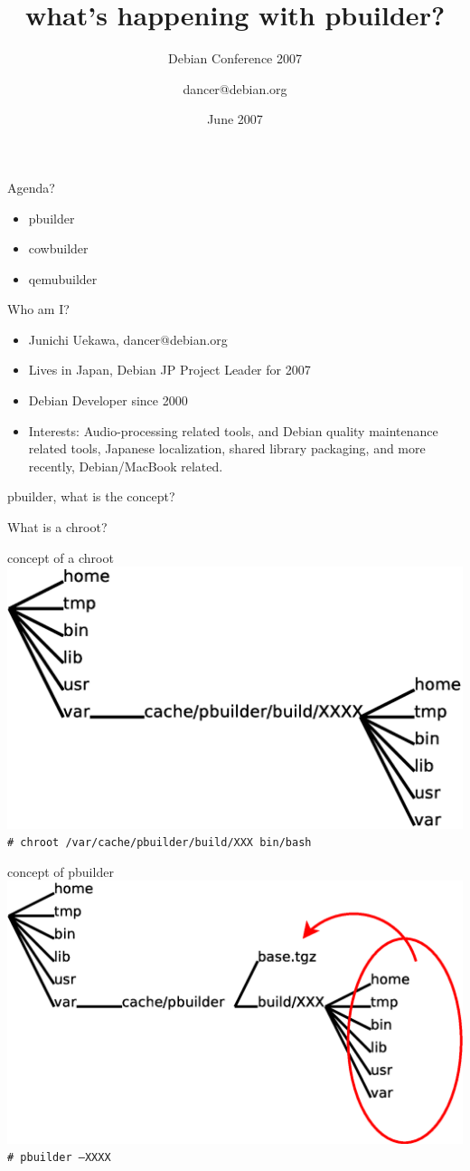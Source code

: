 \documentclass[dvipdfm,17pt,times]{beamer}
\title{what's happening with pbuilder?}
\subtitle{Debian Conference 2007}
\author{dancer@debian.org}
\date{June 2007}
\newcommand{\emtext}[1]{
\begin{frame}{}
 
{\Huge #1
}
\end{frame}
}
\begin{document}
\frame{\titlepage{}}

\begin{frame}{Agenda?}
\begin{itemize}
 \item pbuilder
 \item cowbuilder
 \item qemubuilder
\end{itemize}
\end{frame}

\begin{frame}{Who am I?}
\begin{itemize}
 \item Junichi Uekawa, dancer@debian.org
 \item Lives in Japan, Debian JP Project Leader for 2007
 \item Debian Developer since 2000
 \item Interests: Audio-processing related tools, and 
       Debian quality maintenance related tools,
       Japanese localization, shared library packaging, 
       and more recently, Debian/MacBook related.
\end{itemize}
\end{frame}

\emtext{pbuilder, what is the concept?}

\emtext{What is a chroot?}

\begin{frame}{concept of a chroot}
 \includegraphics[width=0.8\hsize]{chroot.eps}\\
\texttt{\# chroot /var/cache/pbuilder/build/XXX bin/bash}
\end{frame}

\begin{frame}{concept of pbuilder}
 \includegraphics[width=1\hsize]{chroot-pbuilder.eps}\\
\texttt{\# pbuilder --XXXX}
\end{frame}
\end{document}
